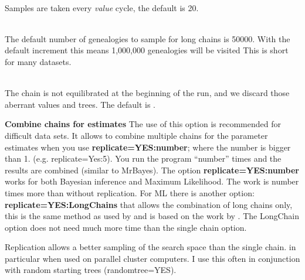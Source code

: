 \begin{description}
\item{}\\
Samples are taken every  \textsl{value} cycle, the default is 20. 

\item{}\\
The default number of genealogies to sample for long chains is 50000. With the default increment this means
1,000,000 genealogies will be visited
This is short for many datasets.
\item{}\\
The chain is not equilibrated at the beginning of the run, and we discard those aberrant values and trees. The default is {}.

\item\textbf{ Combine chains for estimates}
The use of this option is recommended for difficult
data sets. It allows to combine multiple chains for the parameter 
estimates when you use \textbf{ replicate=YES:number}; where the number is bigger than 1. (e.g. replicate=Yes:5). 
You run the program ``number'' times and the results are combined (similar to MrBayes).
The option  \textbf{ replicate=YES:number} works for both Bayesian inference and Maximum Likelihood. The work is number times more than without replication.
For ML there is another option:  \textbf{ replicate=YES:LongChains} that allows the combination of long chains only, this is the same method as used by  \cite{kuhner:1995:eep} and is based on the work by \cite{geyer1991-t}. The LongChain option does not need much more time than the single chain option.

Replication allows a better sampling of the search space than the single chain. in particular when used on parallel cluster computers. I use this often in conjunction with random starting trees (randomtree=YES). 


\end{description}
